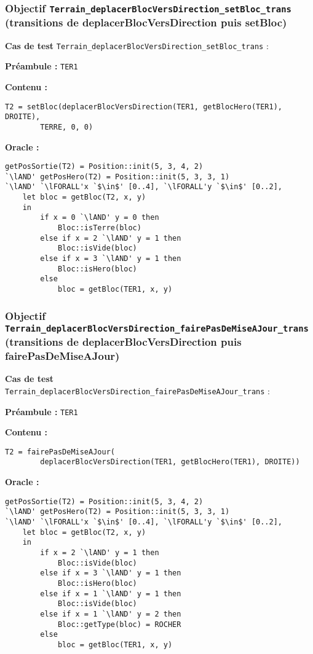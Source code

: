 \documentclass{article}
\newcommand{\cmd}[1]{\texttt{#1}}
\newcommand{\lAND}{$\land$}
\newcommand{\lFORALL}{$\forall$}
\newcommand{\obj}[2]{\subsubsection*{\large{\textbf{Objectif {\cmd{#1} (#2)}}}}}
\newenvironment{cas}[1]
{
	\hspace{1em}\textbf{Cas de test} \cmd{#1} :
	\begin{list}{}{}
}{
	\end{list}\vspace{1em}
}
\newcommand{\pre}[1]{\item \textbf{Préambule :} \cmd{#1}}
\newcommand{\oram}{\item \textbf{Oracle :}}
\newcommand{\opem}{\item \textbf{Contenu :}}
\begin{document}
\obj{Terrain\_deplacerBlocVersDirection\_setBloc\_trans} {transitions de deplacerBlocVersDirection puis setBloc}
	\begin{cas} {Terrain\_deplacerBlocVersDirection\_setBloc\_trans}
		\pre{TER1}
		\opem{}
		\begin{lstlisting}
T2 = setBloc(deplacerBlocVersDirection(TER1, getBlocHero(TER1), DROITE),
		TERRE, 0, 0)
		\end{lstlisting}
		\oram{}
		\begin{lstlisting}
getPosSortie(T2) = Position::init(5, 3, 4, 2)
`\lAND' getPosHero(T2) = Position::init(5, 3, 3, 1)
`\lAND' `\lFORALL'x `$\in$' [0..4], `\lFORALL'y `$\in$' [0..2],
	let bloc = getBloc(T2, x, y)
	in
		if x = 0 `\lAND' y = 0 then
			Bloc::isTerre(bloc)
		else if x = 2 `\lAND' y = 1 then
			Bloc::isVide(bloc)
		else if x = 3 `\lAND' y = 1 then
			Bloc::isHero(bloc)
		else
			bloc = getBloc(TER1, x, y)
		\end{lstlisting}
	\end{cas}

\obj{Terrain\_deplacerBlocVersDirection\_fairePasDeMiseAJour\_trans\\} {transitions de deplacerBlocVersDirection puis fairePasDeMiseAJour}
	\begin{cas} {Terrain\_deplacerBlocVersDirection\_fairePasDeMiseAJour\_trans}
		\pre{TER1}
		\opem{}
		\begin{lstlisting}
T2 = fairePasDeMiseAJour(
		deplacerBlocVersDirection(TER1, getBlocHero(TER1), DROITE))
		\end{lstlisting}
		\oram{}
		\begin{lstlisting}
getPosSortie(T2) = Position::init(5, 3, 4, 2)
`\lAND' getPosHero(T2) = Position::init(5, 3, 3, 1)
`\lAND' `\lFORALL'x `$\in$' [0..4], `\lFORALL'y `$\in$' [0..2],
	let bloc = getBloc(T2, x, y)
	in
		if x = 2 `\lAND' y = 1 then
			Bloc::isVide(bloc)
		else if x = 3 `\lAND' y = 1 then
			Bloc::isHero(bloc)
		else if x = 1 `\lAND' y = 1 then
			Bloc::isVide(bloc)
		else if x = 1 `\lAND' y = 2 then
			Bloc::getType(bloc) = ROCHER
		else
			bloc = getBloc(TER1, x, y)
		\end{lstlisting}
	\end{cas}
\end{document}
